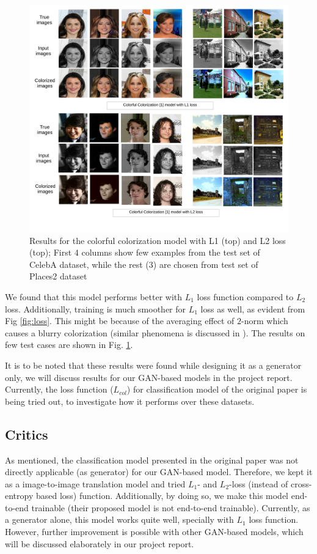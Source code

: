 \documentclass[10pt]{article}
\begin{document}
\begin{figure}[!h]
\centering
\includegraphics[width=\linewidth]{Figs/4.pdf}
\vspace{-15mm}
\caption{Results for the colorful colorization model \cite{zhang2016colorful} with L1 (top) and L2 loss (top); First $4$ columns show few examples from the test set of CelebA \cite{celebA} dataset, while the rest ($3$) are chosen from test set of Places2 \cite{places2}  dataset }
\label{fig:res_full}
\end{figure}  


We found that this model performs better with $L_1$ loss function compared to $L_2$ loss. Additionally, training is much smoother for $L_1$ loss as well, as evident from Fig \ref{fig:loss}. This might be because of the averaging effect of $2$-norm which causes a blurry colorization (similar phenomena is discussed in \cite{zhang2016colorful}). The results on few test cases are shown in Fig. \ref{fig:res_full}. 

It is to be noted that these results were found while designing it as a generator only, we will discuss results for our GAN-based models in the project report. Currently, the loss function ($L_{col}$) for classification model of the original paper is being tried out, to investigate how it performs over these datasets.    

\subsection{Critics}
As mentioned, the classification model presented in the original paper \cite{zhang2016colorful}  was not directly applicable (as generator) for our GAN-based model. Therefore, we kept it as a image-to-image translation model and tried $L_1$- and $L_2$-loss (instead of cross-entropy based loss) function. Additionally, by doing so, we make this model end-to-end trainable (their proposed model is not end-to-end trainable). Currently, as a generator alone, this model works quite well, specially with $L_1$ loss function. However, further improvement is possible with other GAN-based models, which will be discussed elaborately in our project report.  
\end{document}
